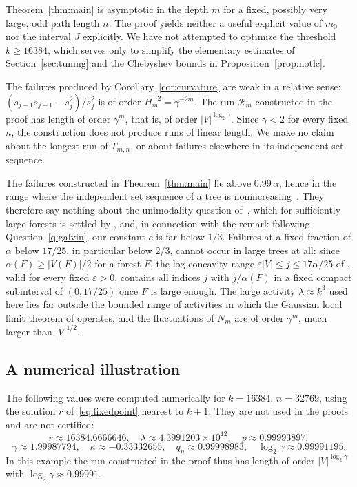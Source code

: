 \documentclass{amsart}
\theoremstyle{definition}
\theoremstyle{remark}
\numberwithin{equation}{section}
\newcommand{\eps}{\varepsilon}
\newcommand{\abs}[1]{\lvert #1\rvert}
\begin{document}
Theorem~\ref{thm:main} is asymptotic in the depth $m$ for a fixed, possibly very large, odd path length $n$. The proof yields neither a useful explicit value of $m_0$ nor the interval $J$ explicitly. We have not attempted to optimize the threshold $k\ge16384$, which serves only to simplify the elementary estimates of Section~\ref{sec:tuning} and the Chebyshev bounds in Proposition~\ref{prop:notlc}.

The failures produced by Corollary~\ref{cor:curvature} are weak in a relative sense: $(s_{j-1}s_{j+1}-s_j^2)/s_j^2$ is of order $H_m^{-2}=\gamma^{-2m}$. The run $\mathcal R_m$ constructed in the proof has length of order $\gamma^m$, that is, of order $\abs V^{\log_2\gamma}$. Since $\gamma<2$ for every fixed $n$, the construction does not produce runs of linear length. We make no claim about the longest run of $T_{m,n}$, or about failures elsewhere in its independent set sequence.

The failures constructed in Theorem~\ref{thm:main} lie above $0.99\,\alpha$, hence in the range where the independent set sequence of a tree is nonincreasing~\cite{LM06}. They therefore say nothing about the unimodality question of~\cite{AMSE87}, which for sufficiently large forests is settled by \cite[Theorem~1.1]{FLNYZ26}, and, in connection with the remark following Question~\ref{q:galvin}, our constant $c$ is far below $1/3$. Failures at a fixed fraction of $\alpha$ below $17/25$, in particular below $2/3$, cannot occur in large trees at all: since $\alpha(F)\ge\abs{V(F)}/2$ for a forest $F$, the log-concavity range $\eps\abs{V}\le j\le17\alpha/25$ of \cite[Theorem~1.2 and Section~9]{FLNYZ26}, valid for every fixed $\eps>0$, contains all indices $j$ with $j/\alpha(F)$ in a fixed compact subinterval of $(0,17/25)$ once $F$ is large enough. The large activity $\lambda\approx k^3$ used here lies far outside the bounded range of activities in which the Gaussian local limit theorem of \cite[Section~6]{FLNYZ26} operates, and the fluctuations of $N_m$ are of order $\gamma^m$, much larger than $\abs V^{1/2}$.

\subsection{A numerical illustration}

The following values were computed numerically for $k=16384$, $n=32769$, using the solution $r$ of~\eqref{eq:fixedpoint} nearest to $k+1$. They are not used in the proofs and are not certified:
\[
r\approx16384.6666646,\quad \lambda\approx4.3991203\times10^{12},\quad p\approx0.99993897,
\]
\[
\gamma\approx1.99987794,\quad \kappa\approx-0.33332655,\quad q_n\approx0.99998983,\quad \log_2\gamma\approx0.99991195 .
\]
In this example the run constructed in the proof thus has length of order $\abs V^{\log_2\gamma}$ with $\log_2\gamma\approx0.99991$.
\end{document}
